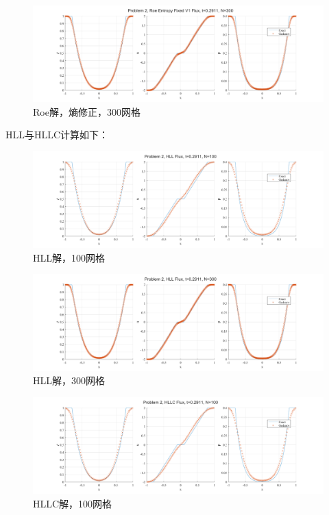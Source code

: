\documentclass[UTF8,zihao=5]{ctexart} %
\begin{document}
\begin{figure}[H]
    \centering
    \includegraphics[width=18cm]{p2_Roe Entropy Fixed V1_N300.png}  %
    \caption{Roe解，熵修正，300网格}
\end{figure}

HLL与HLLC计算如下：

\begin{figure}[H]
    \centering
    \includegraphics[width=18cm]{p2_HLL_N100.png}  %
    \caption{HLL解，100网格}
\end{figure}

\begin{figure}[H]
    \centering
    \includegraphics[width=18cm]{p2_HLL_N300.png}  %
    \caption{HLL解，300网格}
\end{figure}

\begin{figure}[H]
    \centering
    \includegraphics[width=18cm]{p2_HLLC_N100.png}  %
    \caption{HLLC解，100网格}
\end{figure}
\end{document}

